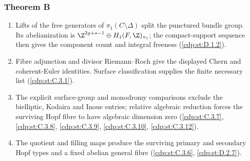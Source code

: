 \hypertarget{outline-II-B}{}
\subsubsection*{Theorem B}
\begin{enumerate}[label=\arabic*.,leftmargin=*]
\item\hypertarget{step-II-B-1}{} Lifts of the free generators of
$\pi_1(C\setminus\Delta)$ split the punctured bundle group.
Its abelianization is $\Z^{2g+s-1}\oplus H_1(F,\Z)_{\pi_1}$;
the compact-support sequence then gives the component count and
integral freeness (\hyperref[cdp:st:D.1.2]{\ref*{cdp:st:D.1.2}}).
\item\hypertarget{step-II-B-2}{} Fibre adjunction and divisor
Riemann--Roch give the displayed Chern and coherent-Euler
identities. Surface classification supplies the finite necessary
list (\hyperref[cdp:st:C.3.1]{\ref*{cdp:st:C.3.1}}).
\item\hypertarget{step-II-B-3}{} The explicit surface-group and
monodromy comparisons exclude the bielliptic, Kodaira and Inoue
entries; relative algebraic reduction forces the surviving Hopf
fibre to have algebraic dimension zero
(\hyperref[cdp:st:C.3.7]{\ref*{cdp:st:C.3.7}},
\hyperref[cdp:st:C.3.8]{\ref*{cdp:st:C.3.8}},
\hyperref[cdp:st:C.3.9]{\ref*{cdp:st:C.3.9}},
\hyperref[cdp:st:C.3.10]{\ref*{cdp:st:C.3.10}},
\hyperref[cdp:st:C.3.12]{\ref*{cdp:st:C.3.12}}).
\item\hypertarget{step-II-B-4}{} The quotient and filling maps
produce the surviving primary and secondary Hopf types and a fixed
abelian general fibre (\hyperref[cdp:st:C.3.6]{\ref*{cdp:st:C.3.6}},
\hyperref[cdp:st:D.2.7]{\ref*{cdp:st:D.2.7}}).
\end{enumerate}

\hypertarget{outline-II-C}{}
